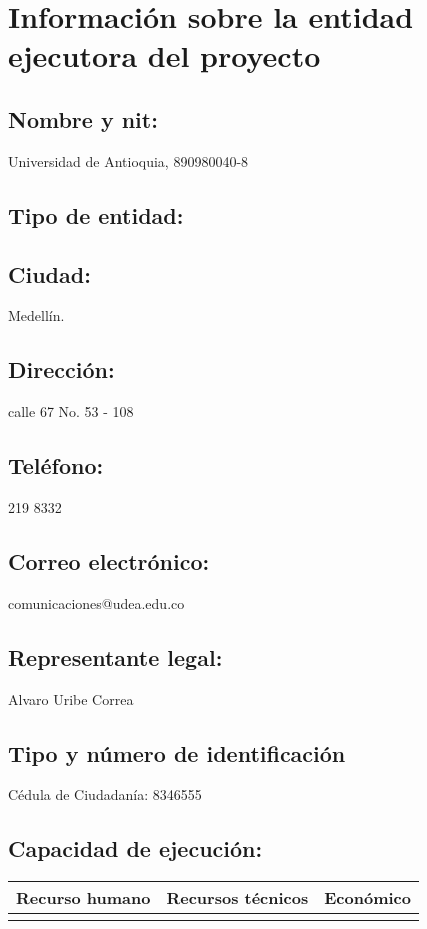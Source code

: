 \section{Información sobre la entidad ejecutora del proyecto}
\subsection{Nombre y nit:    }
Universidad de Antioquia, 890980040-8
\subsection{Tipo de entidad: }
\subsection{Ciudad:                        }
Medellín.
\subsection{Dirección:                     }
calle 67 No. 53 - 108 
\subsection{Teléfono:                      }
 219 8332 
\subsection{Correo electrónico:            }
comunicaciones@udea.edu.co 
\subsection{Representante legal:           }
Alvaro Uribe Correa
\subsection{Tipo y número de identificación}
Cédula de Ciudadanía: 8346555
\subsection{Capacidad de ejecución:        }
\begin{tabular}{|l|l|l|}\hline
    Recurso humano & Recursos técnicos & Económico\\\hline
    & &\\  \hline
\end{tabular}




